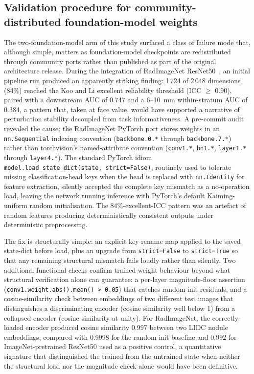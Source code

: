 \subsection{Validation procedure for community-distributed foundation-model weights}

The two-foundation-model arm of this study surfaced a class of failure mode that, although simple, matters as foundation-model checkpoints are redistributed through community ports rather than published as part of the original architecture release. During the integration of RadImageNet ResNet50~\cite{mei2022radimagenet}, an initial pipeline run produced an apparently striking finding: 1\,724 of 2\,048 dimensions (84\%) reached the Koo and Li excellent reliability threshold (ICC $\geq$ 0.90), paired with a downstream AUC of 0.747 and a 6--10~mm within-stratum AUC of 0.384, a pattern that, taken at face value, would have supported a narrative of perturbation stability decoupled from task informativeness. A pre-commit audit revealed the cause: the RadImageNet PyTorch port stores weights in an \texttt{nn.Sequential} indexing convention (\texttt{backbone.0.*} through \texttt{backbone.7.*}) rather than torchvision's named-attribute convention (\texttt{conv1.*}, \texttt{bn1.*}, \texttt{layer1.*} through \texttt{layer4.*}). The standard PyTorch idiom \texttt{model.load\_state\_dict(state, strict=False)}, routinely used to tolerate missing classification-head keys when the head is replaced with \texttt{nn.Identity} for feature extraction, silently accepted the complete key mismatch as a no-operation load, leaving the network running inference with PyTorch's default Kaiming-uniform random initialisation. The 84\%-excellent-ICC pattern was an artefact of random features producing deterministically consistent outputs under deterministic preprocessing.

The fix is structurally simple: an explicit key-rename map applied to the saved state-dict before load, plus an upgrade from \texttt{strict=False} to \texttt{strict=True} so that any remaining structural mismatch fails loudly rather than silently. Two additional functional checks confirm trained-weight behaviour beyond what structural verification alone can guarantee: a per-layer magnitude-floor assertion (\texttt{conv1.weight.abs().mean() > 0.05}) that catches random-init residuals, and a cosine-similarity check between embeddings of two different test images that distinguishes a discriminating encoder (cosine similarity well below 1) from a collapsed encoder (cosine similarity at unity). For RadImageNet, the correctly-loaded encoder produced cosine similarity 0.997 between two LIDC nodule embeddings, compared with 0.9998 for the random-init baseline and 0.992 for ImageNet-pretrained ResNet50 used as a positive control, a quantitative signature that distinguished the trained from the untrained state when neither the structural load nor the magnitude check alone would have been definitive.

